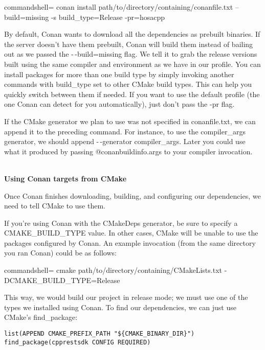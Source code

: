 \begin{tcblisting}{commandshell={}}
conan install path/to/directory/containing/conanfile.txt --build=missing -s
build_type=Release -pr=hosacpp
\end{tcblisting}

By default, Conan wants to download all the dependencies as prebuilt binaries. If the server doesn't have them prebuilt, Conan will build them instead of bailing out as we passed the -\,-build=missing flag. We tell it to grab the release versions built using the same compiler and environment as we have in our profile. You can install packages for more than one build type by simply invoking another commands with build\_type set to other CMake build types. This can help you quickly switch between them if needed. If you want to use the default profile (the one Conan can detect for you automatically), just don't pass the -pr flag.

If the CMake generator we plan to use was not specified in conanfile.txt, we can append it to the preceding command. For instance, to use the compiler\_args generator, we should append -\,-generator compiler\_args. Later you could use what it produced by passing @conanbuildinfo.args to your compiler invocation.

\hspace*{\fill} \\ %
\noindent
\textbf{Using Conan targets from CMake}

Once Conan finishes downloading, building, and configuring our dependencies, we need to tell CMake to use them. 

If you're using Conan with the CMakeDeps generator, be sure to specify a CMAKE\_BUILD\_TYPE value. In other cases, CMake will be unable to use the packages configured by Conan. An example invocation (from the same directory you ran Conan) could be as follows:

\begin{tcblisting}{commandshell={}}
cmake path/to/directory/containing/CMakeLists.txt -
DCMAKE_BUILD_TYPE=Release
\end{tcblisting}

This way, we would build our project in release mode; we must use one of the types we installed using Conan. To find our dependencies, we can just use CMake's find\_package:

\begin{lstlisting}[style=styleCMake]
list(APPEND CMAKE_PREFIX_PATH "${CMAKE_BINARY_DIR}")
find_package(cpprestsdk CONFIG REQUIRED)
\end{lstlisting}

